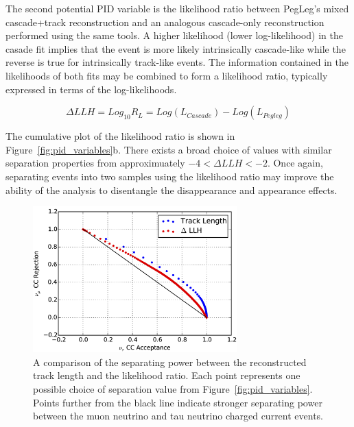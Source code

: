The second potential PID variable is the likelihood ratio between PegLeg's mixed cascade+track reconstruction and an analogous cascade-only reconstruction performed using the same tools.
A higher likelihood (lower log-likelihood) in the casade fit implies that the event is more likely intrinsically cascade-like while the reverse is true for intrinsically track-like events.
The information contained in the likelihoods of both fits may be combined to form a likelihood ratio, typically expressed in terms of the log-likelihoods.

\begin{equation}
	\Delta LLH = Log_{10} R_{L} = Log\left(L_{Cascade}\right) - Log\left(L_{Pegleg}\right)
\end{equation}

The cumulative plot of the likelihood ratio is shown in Figure~\ref{fig:pid_variables}b. 
There exists a broad choice of values with similar separation properties from approximuately $-4 < \Delta LLH < -2$.
Once again, separating events into two samples using the likelihood ratio may improve the ability of the analysis to disentangle the disappearance and appearance effects.

\begin{figure}
\centering
\includegraphics[width=0.7\textwidth]{roc_curves.png} 
\caption[Comparison of separating power between PID variables]{A comparison of the separating power between the reconstructed track length and the likelihood ratio. Each point represents one possible choice of separation value from Figure~\ref{fig:pid_variables}. Points further from the black line indicate stronger separating power between the muon neutrino and tau neutrino charged current events.}
\label{fig:roc_curves}
\end{figure}

